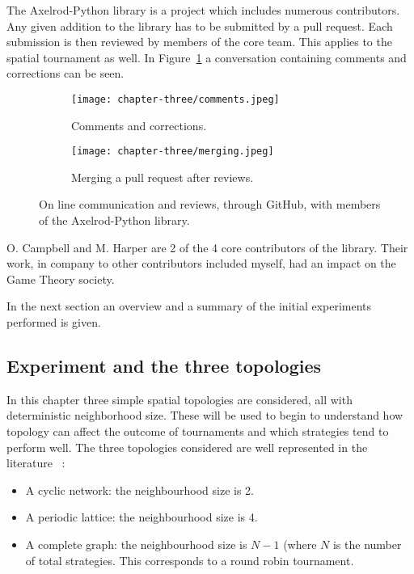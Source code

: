 The Axelrod-Python library is a project which includes numerous contributors.
Any given addition to the
library has to be submitted by a pull request. Each submission is then
reviewed by members of the core team. This applies to the spatial tournament as well.
In Figure~\ref{fig:github} a conversation containing comments and corrections
can be seen.

\begin{figure}[H]
	\centering
	\begin{subfigure}[H]{0.7\textwidth}
		\centering
		\texttt{[image: chapter-three/comments.jpeg]}
		\caption{Comments and corrections.}
	\end{subfigure}
	\hfill
	\begin{subfigure}[H]{0.7\textwidth}\centering
		\centering
		\texttt{[image: chapter-three/merging.jpeg]}
		\caption{Merging a pull request after reviews.}
	\end{subfigure}
	\caption{On line communication and reviews, through GitHub,
	with members of the Axelrod-Python library.}
	\label{fig:github}
\end{figure}

O. Campbell and M. Harper are 2 of the 4 core contributors of the library.
Their work, in company to other contributors included myself, had an impact on
the Game Theory society.

In the next section an overview and a summary of the initial experiments
performed is given.


\subsection{Experiment and the three topologies}

In this chapter three simple spatial topologies are considered, all with
deterministic neighborhood size. These will be used to begin to understand how
topology can affect the outcome of tournaments
and which strategies tend to perform well. The three topologies considered are
well represented in the literature~\cite{Axelrod1980a,Szabo2007,Lutz2013} :
\begin{itemize}
	\item A cyclic network: the neighbourhood size is 2. %
	\item A periodic lattice: the neighbourhood size is 4. %
	\item A complete graph: the neighbourhood size is \(N-1\) (where \(N\) is
	      the number of total strategies. This corresponds to a round robin
	      tournament. %
\end{itemize}

